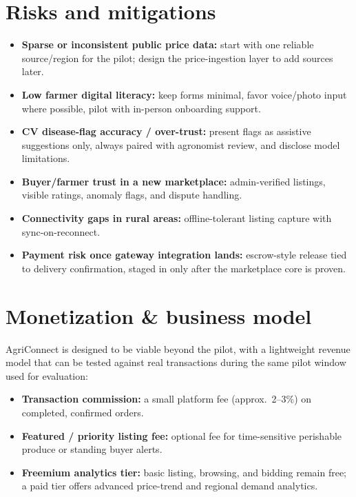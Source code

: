\documentclass[11pt,a4paper]{article}
\begin{document}
\section{Risks and mitigations}
\begin{itemize}[leftmargin=0.7cm]
    \item \textbf{Sparse or inconsistent public price data:} start with one reliable source/region for the pilot; design the price-ingestion layer to add sources later.
    \item \textbf{Low farmer digital literacy:} keep forms minimal, favor voice/photo input where possible, pilot with in-person onboarding support.
    \item \textbf{CV disease-flag accuracy / over-trust:} present flags as assistive suggestions only, always paired with agronomist review, and disclose model limitations.
    \item \textbf{Buyer/farmer trust in a new marketplace:} admin-verified listings, visible ratings, anomaly flags, and dispute handling.
    \item \textbf{Connectivity gaps in rural areas:} offline-tolerant listing capture with sync-on-reconnect.
    \item \textbf{Payment risk once gateway integration lands:} escrow-style release tied to delivery confirmation, staged in only after the marketplace core is proven.
\end{itemize}

\section{Monetization \& business model}
AgriConnect is designed to be viable beyond the pilot, with a lightweight revenue model that can be tested against real transactions during the same pilot window used for evaluation:
\begin{itemize}[leftmargin=0.7cm]
    \item \textbf{Transaction commission:} a small platform fee (approx.\ 2--3\%) on completed, confirmed orders.
    \item \textbf{Featured / priority listing fee:} optional fee for time-sensitive perishable produce or standing buyer alerts.
    \item \textbf{Freemium analytics tier:} basic listing, browsing, and bidding remain free; a paid tier offers advanced price-trend and regional demand analytics.
\end{itemize}
\end{document}

